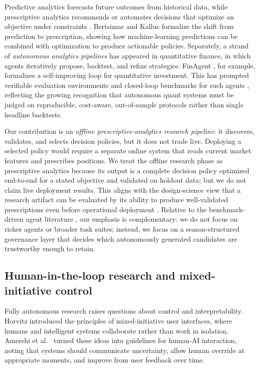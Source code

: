 \documentclass[analytics,article,submit,pdftex,moreauthors]{Definitions/mdpi}
\begin{document}
Predictive analytics forecasts future outcomes from historical data, while prescriptive analytics recommends or automates decisions that optimize an objective under constraints \citep{davenport_2007, shmueli_2011}. Bertsimas and Kallus \citep{bertsimas_2020} formalize the shift from prediction to prescription, showing how machine-learning predictions can be combined with optimization to produce actionable policies. Separately, a strand of \emph{autonomous analytics pipelines} has appeared in quantitative finance, in which agents iteratively propose, backtest, and refine strategies: FinAgent \citep{zhang_2024_finagent}, for example, formalizes a self-improving loop for quantitative investment. This has prompted verifiable evaluation environments and closed-loop benchmarks for such agents \citep{sun_2023_trademaster, sun_2023_prudex_compass}, reflecting the growing recognition that autonomous quant systems must be judged on reproducible, cost-aware, out-of-sample protocols rather than single headline backtests.

Our contribution is an \emph{offline prescriptive-analytics research pipeline}: it discovers, validates, and selects decision policies, but it does not trade live. Deploying a selected policy would require a separate online system that reads current market features and prescribes positions. We treat the offline research phase as prescriptive analytics because its output is a complete decision policy optimized end-to-end for a stated objective and validated on holdout data; but we do not claim live deployment results. This aligns with the design-science view that a research artifact can be evaluated by its ability to produce well-validated prescriptions even before operational deployment \citep{hevner_2004}. Relative to the benchmark-driven agent literature \citep{sun_2023_trademaster, sun_2023_prudex_compass}, our emphasis is complementary: we do not focus on richer agents or broader task suites; instead, we focus on a season-structured governance layer that decides which autonomously generated candidates are trustworthy enough to retain.

\subsection{Human-in-the-loop research and mixed-initiative control}\label{human-in-the-loop-research-and-mixed-initiative-control}

Fully autonomous research raises questions about control and interpretability. Horvitz \citep{horvitz_1999} introduced the principles of mixed-initiative user interfaces, where humans and intelligent systems collaborate rather than work in isolation. Amershi et al.~\citep{amershi_2019} turned these ideas into guidelines for human-AI interaction, noting that systems should communicate uncertainty, allow human override at appropriate moments, and improve from user feedback over time.
\end{document}
